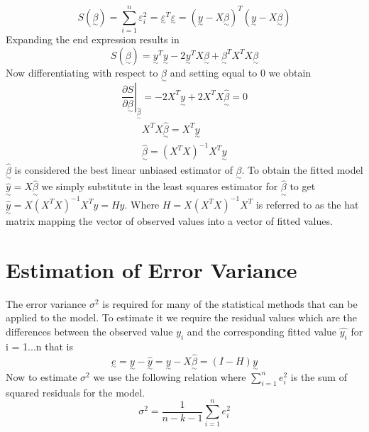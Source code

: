 \documentclass[12pt]{report}
\begin{document}
\begin{equation}
    S(\underset{\sim}\beta) = \sum_{i=1}^n \varepsilon_{i}^2
    = \underset{\sim}\varepsilon^T \underset{\sim}\varepsilon
    = (\underset{\sim}y - {X}\underset{\sim}\beta)^T(\underset{\sim}y - {X}\underset{\sim}\beta)
\end{equation}
Expanding the end expression results in
\begin{equation}
    S(\underset{\sim}\beta) = \underset{\sim}y^{T}\underset{\sim}y - {2\underset{\sim}y^{T}X}\underset{\sim}\beta + \underset{\sim}\beta^{T}X^{T}X\underset{\sim}\beta
\end{equation}
Now differentiating with respect to $\underset{\sim}\beta$ and setting equal to 0 we obtain
\begin{equation}
    \left. \frac{\partial S}{\partial \underset{\sim}\beta}\right|_{\hat{\underset{\sim}\beta}} = -2X^{T}\underset{\sim}y + 2X^{T}X\hat{\underset{\sim}\beta} = 0
\end{equation}
\begin{equation*}
\begin{split}
    X^{T}X\hat{\underset{\sim}\beta} = X^{T}\underset{\sim}y
    \\
    \hat{\underset{\sim}\beta} = (X^{T}X)^{-1}X^{T}\underset{\sim}y
\end{split}
\end{equation*}
$\hat{\underset{\sim}\beta}$ is considered the best linear unbiased estimator of $\underset{\sim}\beta$. To obtain the fitted model $\hat{\underset{\sim}y} = X\hat{\underset{\sim}\beta}$ we simply substitute in the least squares estimator for $\hat{\underset{\sim}\beta}$ to get $\hat{\underset{\sim}y} = X(X^{T}X)^{-1}X^{T}y = Hy$. Where $H = X(X^{T}X)^{-1}X^{T}$ is referred to as the hat matrix mapping the vector of observed values into a vector of fitted values.

\section{Estimation of Error Variance}

The error variance $\sigma^2$ is required for many of the statistical methods that can be applied to the model. To estimate it we require the residual values which are the differences between the observed value $y_{i}$ and the corresponding fitted value $\hat{y_{i}}$ for i = 1...n that is 
\begin{equation}
    \underset{\sim}e = \underset{\sim}y - \hat{\underset{\sim}y} = \underset{\sim}y - X\hat{\underset{\sim}\beta} = (I - H)\underset{\sim}y
\end{equation}
Now to estimate $\sigma^2$ we use the following relation where $\sum_{i=1}^n e_{i}^2$ is the sum of squared residuals for the model.
\begin{equation}
    \sigma^2 = \frac{1}{n-k-1} \sum_{i=1}^n e_{i}^2
\end{equation}
\end{document}
